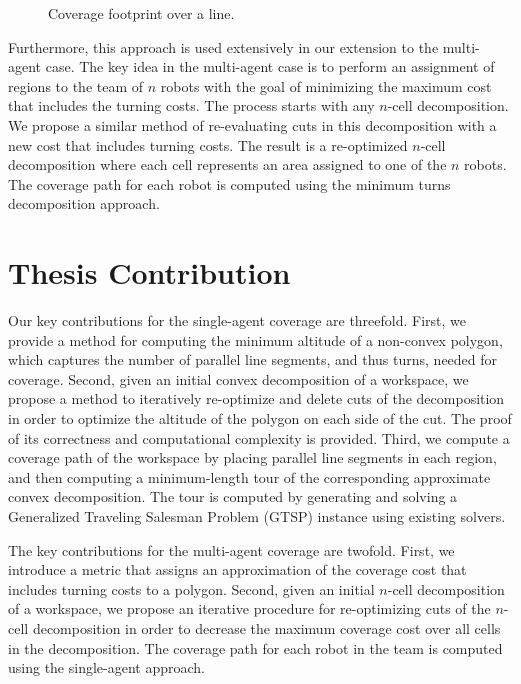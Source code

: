 \documentclass[../main.tex]{subfiles}
\begin{document}
\begin{figure}
	\centering
	
	\caption{Coverage footprint over a line.}
	\label{fig:line_footprint_ex}
\end{figure}

Furthermore, this approach is used extensively in our extension to the multi-agent case. The key idea in the multi-agent case is to perform an assignment of regions to the team of $n$ robots with the goal of minimizing the maximum cost that includes the turning costs. The process starts with any $n$-cell decomposition. We propose a similar method of re-evaluating cuts in this decomposition with a new cost that includes turning costs. The result is a re-optimized $n$-cell decomposition where each cell represents an area assigned to one of the $n$ robots. The coverage path for each robot is computed using the minimum turns decomposition approach.


\section{Thesis Contribution}
\label{section:thesis_contribution}

Our key contributions for the single-agent coverage are threefold. First, we provide a method for computing the minimum altitude of a non-convex polygon, which captures the number of parallel line segments, and thus turns, needed for coverage. Second, given an initial convex decomposition of a workspace, we propose a method to iteratively re-optimize and delete cuts of the decomposition in order to optimize the altitude of the polygon on each side of the cut. The proof of its correctness and computational complexity is provided. Third, we compute a coverage path of the workspace by placing parallel line segments in each region, and then computing a minimum-length tour of the corresponding approximate convex decomposition. The tour is computed by generating and solving a Generalized Traveling Salesman Problem (GTSP) instance using existing solvers.

The key contributions for the multi-agent coverage are twofold. First, we introduce a metric that assigns an approximation of the coverage cost that includes turning costs to a polygon. Second, given an initial $n$-cell decomposition of a workspace, we propose an iterative procedure for re-optimizing cuts of the $n$-cell decomposition in order to decrease the maximum coverage cost over all cells in the decomposition. The coverage path for each robot in the team is computed using the single-agent approach.
\end{document}
